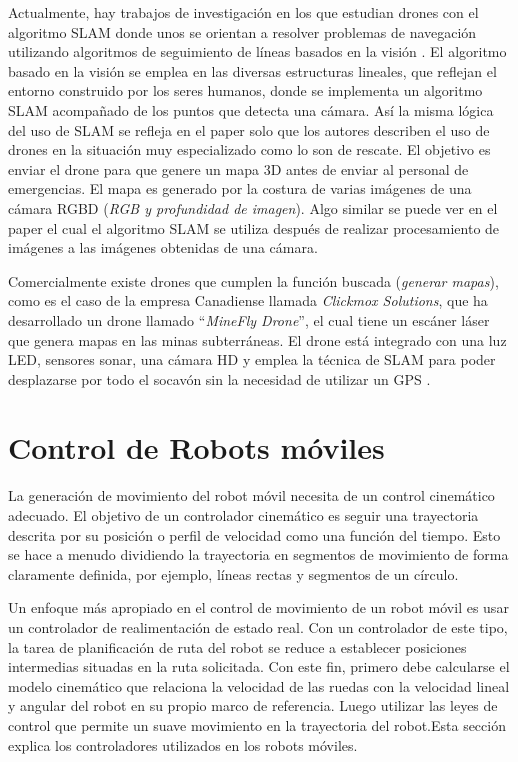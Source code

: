 Actualmente, hay trabajos de investigación en los que estudian drones con el algoritmo SLAM  donde unos se orientan a resolver problemas de navegación utilizando algoritmos de seguimiento de líneas basados en la visión \cite{Verschoor2013}. El algoritmo basado en la visión se emplea en las diversas estructuras lineales, que reflejan el entorno construido por los seres humanos, donde se implementa un algoritmo SLAM acompañado de los puntos que detecta una cámara. Así la misma lógica del uso de SLAM se refleja en el paper \cite{Skoda2015} solo que los autores describen el uso de drones en la situación muy especializado como lo son de rescate. El objetivo es enviar el drone para que genere un mapa 3D antes de enviar al personal de emergencias. El mapa es generado por la costura de varias imágenes de una cámara RGBD (\textit{RGB y profundidad de imagen}). Algo similar se puede ver en el paper \cite{Heukels2015} el cual el algoritmo SLAM se utiliza después de realizar procesamiento de imágenes a las imágenes obtenidas de una cámara.

Comercialmente existe drones que cumplen la función buscada (\textit{generar mapas}), como es el caso de la empresa Canadiense llamada \textit{Clickmox Solutions}, que ha desarrollado un drone llamado “\textit{MineFly Drone}”, el cual tiene un escáner láser que genera mapas en las minas subterráneas. El drone está integrado con una luz LED, sensores sonar, una cámara HD y emplea la técnica de SLAM para poder desplazarse por todo el socavón sin la necesidad de utilizar un GPS \cite{Solutions2016}. 


\section{Control de Robots m\'oviles}

La generaci\'on de movimiento del robot m\'ovil necesita de un control cinem\'atico adecuado. El objetivo de un controlador cinem\'atico es seguir una trayectoria descrita por su posici\'on o perfil de velocidad como una funci\'on del tiempo. Esto se hace a menudo dividiendo la trayectoria en segmentos de movimiento de forma claramente definida, por ejemplo, l\'ineas rectas y segmentos de un c\'irculo.

Un enfoque m\'as apropiado en el control de movimiento de un robot m\'ovil es usar un controlador de realimentaci\'on de estado real. Con un controlador de este tipo, la tarea de planificaci\'on de ruta del robot se reduce a establecer posiciones intermedias situadas en la ruta solicitada. Con este fin, primero debe calcularse el modelo cinem\'atico que relaciona la velocidad de las ruedas con la velocidad lineal y angular del robot en su propio marco de referencia. Luego utilizar las leyes de control que permite un suave movimiento en la trayectoria del robot.Esta secci\'on explica los controladores utilizados en los robots m\'oviles.

